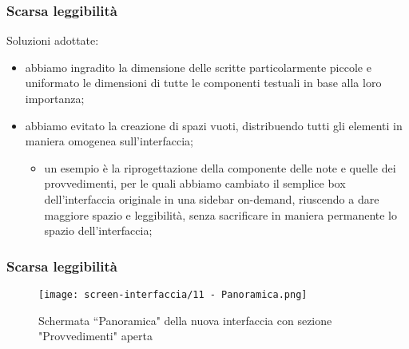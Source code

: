 \begin{frame}
    \frametitle{Scarsa leggibilità}
    Soluzioni adottate: 
    \begin{itemize}
        \item<1-> abbiamo ingradito la dimensione delle scritte particolarmente piccole e uniformato le dimensioni di tutte le componenti testuali in base alla loro importanza;
        \item<2-> abbiamo evitato la creazione di spazi vuoti, distribuendo tutti gli elementi in maniera omogenea sull'interfaccia;
        \begin{itemize}
            \item<2-> un esempio è la riprogettazione della componente delle note e quelle dei provvedimenti, per le quali abbiamo cambiato il semplice box dell'interfaccia originale in una sidebar on-demand, riuscendo a dare maggiore spazio e leggibilità, senza sacrificare in maniera permanente lo spazio dell'interfaccia;
        \end{itemize}
    \end{itemize}    

\end{frame}

\begin{frame}
    \frametitle{Scarsa leggibilità}
    \begin{figure}
        \centering
        \texttt{[image: screen-interfaccia/11 - Panoramica.png]}
        \caption{Schermata ``Panoramica" della nuova interfaccia con sezione "Provvedimenti" aperta}
    \end{figure}
\end{frame}

